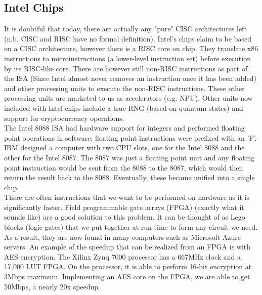 \documentclass[10pt]{article}
\begin{document}
\subsection{Intel Chips}
It is doubtful that today, there are actually any "pure" CISC architectures left (n.b. CISC and RISC have no formal definition). Intel's chips claim to be based on a CISC architecture, however there is a RISC core on chip. They translate x86 instructions to microinstructions (a lower-level instruction set) before execution by its RISC-like core. There are however still non-RISC instructions as part of the ISA (Since Intel almost never removes an instruction once it has been added) and other processing units to execute the non-RISC instructions. These other processing units are marketed to us as accelerators (e.g. NPU). Other units now included with Intel chips include a true RNG (based on quantum states) and support for cryptocurrency operations.\\
\newline
The Intel 8088 ISA had hardware support for integers and performed floating point operations in software; floating point instructions were prefixed with an 'F'. IBM designed a computer with two CPU slots, one for the Intel 8088 and the other for the Intel 8087. The 8087 was just a floating point unit and any floating point instruction would be sent from the 8088 to the 8087, which would then return the result back to the 8088. Eventually, these became unified into a single chip.\\
\newline
There are often instructions that we want to be performed on hardware as it is significantly faster. Field programmable gate arrays (FPGA) (exactly what it sounds like) are a good solution to this problem. It can be thought of as Lego blocks (logic-gates) that we put together at run-time to form any circuit we need. As a result, they are now found in many computers such as Microsoft Azure servers. An example of the speedup that can be realized from an FPGA is with AES encryption. The Xilinx Zynq 7000 processor has a 667MHz clock and a 17,000 LUT FPGA. On the processor, it is able to perform 16-bit encryption at 3Mbps maximum. Implementing an AES core on the FPGA, we are able to get 50Mbps, a nearly 20x speedup.\\
\newline
\end{document}
